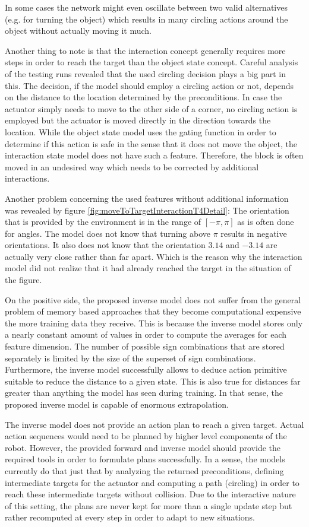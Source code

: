 In some cases the network might even oscillate between two valid alternatives (e.g. for turning the object) which results in many circling actions around the object without actually moving it much.

Another thing to note is that the interaction concept generally requires more steps in order to reach the target than the object state concept. Careful analysis of the testing runs revealed that the used circling decision plays a big part in this. The decision, if the model should employ a circling action or not, depends on the distance to the location determined by the preconditions. In case the actuator simply needs to move to the other side of a corner, no circling action is employed but the actuator is moved directly in the direction towards the location. While the object state model uses the gating function in order to determine if this action is safe in the sense that it does not move the object, the interaction state model does not have such a feature. Therefore, the block is often moved in an undesired way which needs to be corrected by additional interactions.

Another problem concerning the used features without additional information was revealed by figure \ref{fig:moveToTargetInteractionT4Detail}: The orientation that is provided by the environment is in the range of $[-\pi,\pi]$ as is often done for angles. The model does not know that turning above $\pi$ results in negative orientations. It also does not know that the orientation $3.14$ and $-3.14$ are actually very close rather than far apart. Which is the reason why the interaction model did not realize that it had already reached the target in the situation of the figure. 

On the positive side, the proposed inverse model does not suffer from the general problem of memory based approaches that they become computational expensive the more training data they receive. This is because the inverse model stores only a nearly constant amount of values in order to compute the averages for each feature dimension. The number of possible sign combinations that are stored separately is limited by the size of the superset of sign combinations. Furthermore, the inverse model successfully allows to deduce action primitive suitable to reduce the distance to a given state. This is also true for distances far greater than anything the model has seen during training. In that sense, the proposed inverse model is capable of enormous extrapolation.

The inverse model does not provide an action plan to reach a given target. Actual action sequences would need to be planned by higher level components of the robot. 
However, the provided forward and inverse model should provide the required tools in order to formulate plans successfully.
In a sense, the models currently do that just that by analyzing the returned preconditions, defining intermediate targets for the actuator and computing a path (circling) in order to reach these intermediate targets without collision. Due to the interactive nature of this setting, the plans are never kept for more than a single update step but rather recomputed at every step in order to adapt to new situations.

